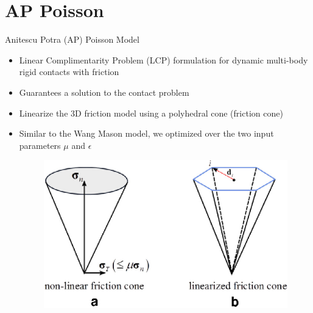 \section{AP Poisson}

\begin{frame}{Anitescu Potra (AP) Poisson Model \cite{APPoisson}}
\begin{itemize}
    \item Linear Complimentarity Problem (LCP) formulation for dynamic multi-body rigid contacts with friction
    \item Guarantees a solution to the contact problem
    \item Linearize the 3D friction model using a polyhedral cone (friction cone)
    \item Similar to the Wang Mason model, we optimized over the two input parameters $\mu$ and $\epsilon$
    \begin{figure}
        \centering
        \includegraphics[scale=0.25]{figures/linearFrictionCone.png}
\end{figure}
    
\end{itemize}

\end{frame}

